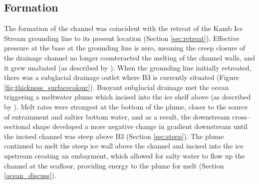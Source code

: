\subsection{Formation}
The formation of the channel was coincident with the retreat of the Kamb Ice Stream grounding line to its present location (Section \ref{sec:retreat}). Effective pressure at the base at the grounding line is zero, meaning the creep closure of the drainage channel no longer counteracted the melting of the channel walls, and it grew unabated (as described by \cite{drews2015evolution}). 
When the grounding line initially retreated, there was a subglacial drainage outlet where B3 is currently situated (Figure \ref{fig:thickness_surfacecolour}). Buoyant subglacial drainage met the ocean triggering a meltwater plume which incised into the ice shelf above (as described by \cite{hewitt2020subglacial}). Melt rates were strongest at the bottom of the plume, closer to the source of entrainment and saltier bottom water, and as a result, the downstream cross--sectional shape developed a more negative change in gradient downstream until the incised channel was steep above B3 (Section \ref{sec:steep}). The plume continued to melt the steep ice wall above the channel and incised into the ice upstream creating an embayment, which allowed for salty water to flow up the channel at the seafloor, providing energy to the plume for melt (Section \ref{ocean_discuss}). 


